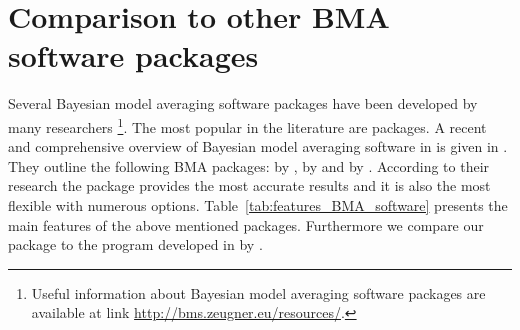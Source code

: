 \section{Comparison to other BMA software packages}\label{BmaGretlSec4}
Several Bayesian model averaging software packages have been developed by many
researchers%
\footnote{Useful information about Bayesian model averaging software
	packages are available at link
	\url{http://bms.zeugner.eu/resources/}.}.  The most popular in the
literature are  packages.  A recent and comprehensive overview of
Bayesian model averaging software in  is given in
\cite{AminiParmeter2011}. They outline the following BMA packages:
 by \cite{Zeugner_BMS},  by
\cite{ClydeLittmanGhosh_BAS} and  by
\cite{RafteryHoetingVolinskyPainterYeung_BMA}.  According to their
research the  package provides the most accurate results and
it is also the most flexible with numerous options.
Table~\ref{tab:features_BMA_software} presents the main features of
the above mentioned packages.  Furthermore we compare our  package
to the  program developed in  by
\cite{FernandezLeySteel2001b}.

